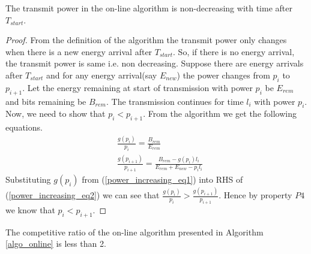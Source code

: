 \begin{lemma}
The transmit power in the on-line algorithm is non-decreasing with time after $T_{start}$.
\label{online_power}
\end{lemma}
\begin{proof}
From the definition of the algorithm the transmit power only changes when there is a new energy arrival after $T_{start}$. So, if there is no energy arrival, the transmit power is same i.e. non decreasing. Suppose there are energy arrivals after $T_{start}$ and for any energy arrival(say $E_{new}$) the power changes from $p_i$ to $p_{i+1}$. Let the energy remaining at start of transmission with power $p_i$ be $E_{rem}$ and bits remaining be $B_{rem}$. The transmission continues for time $l_i$ with power $p_i$. Now, we need to show that $p_i<p_{i+1}$. From the algorithm we get the following equations. 
\begin{align}
&\frac{g(p_i)}{p_i}=\frac{B_{rem}}{E_{rem}} \label{power_increasing_eq1}
\\
&\frac{g(p_{i+1})}{p_{i+1}}=\frac{B_{rem}-g(p_i) l_i}{E_{rem}+E_{new}-p_i l_i}\label{power_increasing_eq2}
\end{align}
Substituting $g(p_i)$ from (\ref{power_increasing_eq1}) into RHS of (\ref{power_increasing_eq2}) we can see that $\frac{g(p_i)}{p_i}>\frac{g(p_{i+1})}{p_{i+1}}$. Hence by property $P4$ we know that $p_i<p_{i+1}$.
\end{proof}
\begin{theorem}
The competitive ratio of the on-line algorithm presented in Algorithm \ref{algo_online} is less than 2.
\end{theorem}
